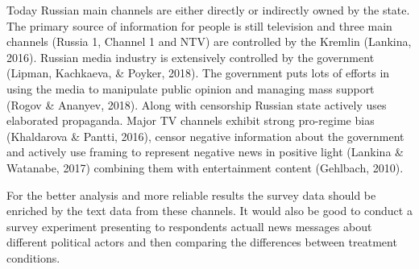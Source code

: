 \documentclass[
  english,
  man]{apa6}
\begin{document}
Today Russian main channels are either directly or indirectly owned by the state. The primary source of information for people is still television and three main channels (Russia 1, Channel 1 and NTV) are controlled by the Kremlin (Lankina, 2016). Russian media industry is extensively controlled by the government (Lipman, Kachkaeva, \& Poyker, 2018). The government puts lots of efforts in using the media to manipulate public opinion and managing mass support (Rogov \& Ananyev, 2018). Along with censorship Russian state actively uses elaborated propaganda. Major TV channels exhibit strong pro-regime bias (Khaldarova \& Pantti, 2016), censor negative information about the government and actively use framing to represent negative news in positive light (Lankina \& Watanabe, 2017) combining them with entertainment content (Gehlbach, 2010).

For the better analysis and more reliable results the survey data should be enriched by the text data from these channels. It would also be good to conduct a survey experiment presenting to respondents actuall news messages about different political actors and then comparing the differences between treatment conditions.
\end{document}
